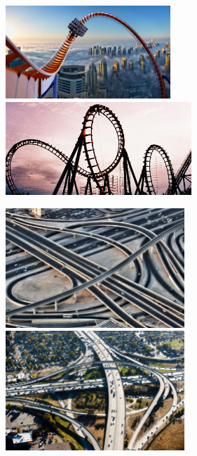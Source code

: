 \begin{center}
	\includegraphics[height=3.5cm]{./images/ch03/RC-1.jpg}\quad
	\includegraphics[height=3.5cm]{./images/ch03/RC-2.jpg}
	
	\bigskip
	
	
	\includegraphics[height=4.5cm]{./images/ch03/HW-1.jpg}\quad
	\includegraphics[height=4.5cm]{./images/ch03/HW-2.jpg}
	
\end{center}

